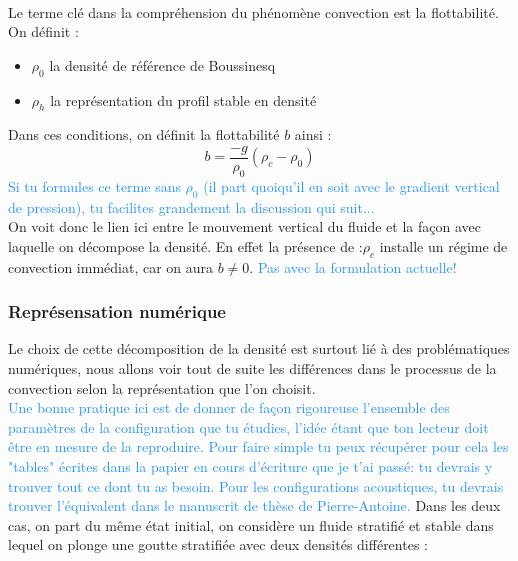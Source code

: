 \documentclass{rapportECC}
\newcommand{\FAadd}[1]{\textcolor{DodgerBlue}{{#1}}}                     %
\begin{document}
\\
\vspace{0.5 cm}
Le terme clé dans la compréhension du phénomène convection est la flottabilité. \\
On définit :
\begin{itemize}
    \item $\rho_0$ la densité de référence de Boussinesq
    \item $\rho_h$ la représentation du profil stable en densité
\end{itemize}
Dans ces conditions, on définit la flottabilité $b$ ainsi :
\begin{equation}
    b = \dfrac{-g}{\rho_0}(\rho_c - \rho_0)
\end{equation}
\FAadd{Si tu formules ce terme sans $\rho_0$ (il part quoiqu'il en soit avec le gradient vertical de pression), tu facilites grandement la discussion qui suit...}
\\
On voit donc le lien ici entre le mouvement vertical du fluide et la façon avec laquelle on décompose la densité. En effet la présence de :$\rho_c$ installe un régime de convection immédiat, car on aura $b \neq 0$. \FAadd{Pas avec la formulation actuelle!}\\

\subsubsection{Représensation numérique}

Le choix de cette décomposition de la densité est surtout lié à  des problématiques numériques, nous allons voir tout de suite les différences dans le processus de la convection selon la représentation que l'on choisit. \\
\FAadd{Une bonne pratique ici est de donner de façon rigoureuse l'ensemble des paramètres de la configuration que tu étudies, l'idée étant que ton lecteur doit être en mesure de la reproduire. Pour faire simple tu peux récupérer pour cela les "tables" écrites dans la papier en cours d'écriture que je t'ai passé: tu devrais y trouver tout ce dont tu as besoin. Pour les configurations acoustiques, tu devrais trouver l'équivalent dans le manuscrit de thèse de Pierre-Antoine.}
Dans les deux cas, on part du même état initial, on considère un fluide stratifié et stable dans lequel on plonge une goutte stratifiée avec deux densités différentes :
\end{document}

